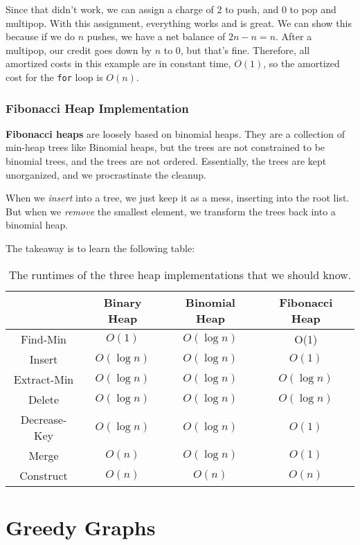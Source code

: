 \documentclass[11pt]{article}
\begin{document}
Since that didn't work, we can assign a charge of 2 to push, and 0 to pop and multipop. With this assignment, everything works and is great. We can show this because if we do $n$ pushes, we have a net balance of $2n - n = n$. After a multipop, our credit goes down by $n$ to 0, but that's fine. Therefore, all amortized costs in this example are in constant time, $O(1)$, so the amortized cost for the \texttt{for} loop is $O(n)$.

\subsubsection{Fibonacci Heap Implementation}
\textbf{Fibonacci heaps} are loosely based on binomial heaps. They are a collection of min-heap trees like Binomial heaps, but the trees are not constrained to be binomial trees, and the trees are not ordered. Essentially, the trees are kept unorganized, and we procrastinate the cleanup.

When we \textit{insert} into a tree, we just keep it as a mess, inserting into the root list. But when we \textit{remove} the smallest element, we transform the trees back into a binomial heap. 

The takeaway is to learn the following table:
\begin{table}[H]
    \centering
    \begin{tabular}{c|c|c|c}
    \toprule
         & Binary Heap & Binomial Heap & Fibonacci Heap \\ \midrule
       Find-Min  & $O(1)$ & $O(\log n)$ & O(1) \\
       Insert & $O(\log n)$ & $O(\log n)$ & $O(1)$ \\
       Extract-Min & $O(\log n)$ & $O(\log n)$ & $O(\log n)$ \\
       Delete & $O(\log n)$ & $O(\log n)$ & $O(\log n)$ \\
       Decrease-Key & $O(\log n)$ & $O(\log n)$ & $O(1)$ \\
       Merge & $O(n)$ & $O(\log n)$ & $O(1)$ \\
       Construct & $O(n)$ & $O(n)$ & $O(n)$ \\ 
    \bottomrule
    \end{tabular}
    \caption{The runtimes of the three heap implementations that we should know.}
    \label{tab:heap_costs}
\end{table}

\section{Greedy Graphs}
\end{document}
